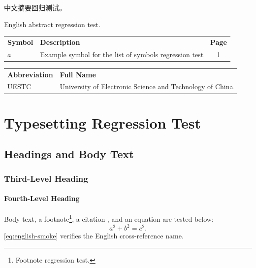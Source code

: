 \documentclass[english,tocdepth3]{uestcthesis}
\begin{document}
\uestcfrontmatter

\zhabstract
中文摘要回归测试。

\enabstract
English abstract regression test.

\uestctableofcontents
\uestclistoffigures
\uestclistoftables
\uestcsymbols
\begingroup
\renewcommand{\arraystretch}{1.3}
\setlength{\tabcolsep}{9pt}
\noindent
\begin{tabularx}{\linewidth}{l>{\raggedright\arraybackslash}Xc}
    \textbf{Symbol} & \textbf{Description} & \textbf{Page} \\
    $a$ & Example symbol for the list of symbols regression test & 1 \\
\end{tabularx}
\endgroup
\uestcacronyms
\begingroup
\renewcommand{\arraystretch}{1.3}
\setlength{\tabcolsep}{9pt}
\noindent
\begin{tabularx}{\linewidth}{l>{\raggedright\arraybackslash}X}
    \textbf{Abbreviation} & \textbf{Full Name} \\
    UESTC & University of Electronic Science and Technology of China \\
\end{tabularx}
\endgroup

\uestcmainmatter

\chapter{Typesetting Regression Test}
\section{Headings and Body Text}
\subsection{Third-Level Heading}
\subsubsection{Fourth-Level Heading}

Body text, a footnote\footnote{Footnote regression test.}, a citation
\cite{lamport1994latex}, and an equation are tested below:
\begin{equation}
    a^2+b^2=c^2.
    \label{eq:english-smoke}
\end{equation}
\autoref{eq:english-smoke} verifies the English cross-reference name.
\end{document}
